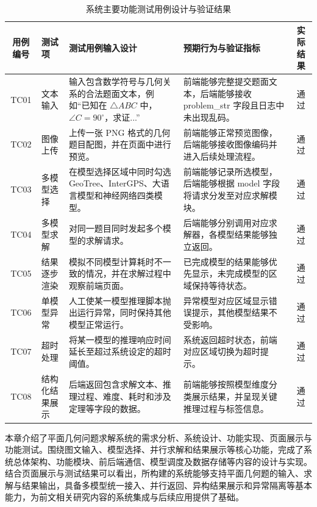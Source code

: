 \begin{table}[htbp]
    \small
    \centering
    \caption{系统主要功能测试用例设计与验证结果}
    \label{tab:function_test}
    \begin{tabularx}{\textwidth}{
        c
        >{\raggedright\arraybackslash}p{6em}
        >{\raggedright\arraybackslash}X
        >{\raggedright\arraybackslash}X
        c
        }
        \toprule
        用例编号 & 测试项 & 测试用例输入设计 & 预期行为与验证指标 & 实际结果 \\
        \midrule
        TC01 & 文本输入 & 输入包含数学符号与几何关系的合法题面文本，例如“已知在 $\triangle ABC$ 中，$\angle C=90^\circ$，求证...” & 前端能够完整提交题面文本，后端能够接收 problem\_str 字段且日志中未出现乱码。 & 通过 \\
        
        \addlinespace[0.3pt]
        TC02 & 图像上传 & 上传一张 PNG 格式的几何题目配图，并在页面中进行预览。 & 前端能够正常预览图像，后端能够接收图像编码并进入后续处理流程。 & 通过 \\
        
        \addlinespace[0.3pt]
        TC03 & 多模型选择 & 在模型选择区域中同时勾选 GeoTree、InterGPS、大语言模型和神经网络四类模型。 & 前端能够记录所选模型，后端能够根据 model 字段将请求分发至对应求解模块。 & 通过 \\
        
        \addlinespace[0.3pt]
        TC04 & 多模型求解 & 对同一题目同时发起多个模型的求解请求。 & 后端能够分别调用对应求解器，各模型结果能够独立返回。 & 通过 \\
        
        \addlinespace[0.3pt]
        TC05 & 结果逐步渲染 & 模拟不同模型计算耗时不一致的情况，并在求解过程中观察前端页面。 & 已完成模型的结果能够优先显示，未完成模型的区域保持等待状态。 & 通过 \\
        
        \addlinespace[0.3pt]
        TC06 & 单模型异常 & 人工使某一模型推理脚本抛出运行异常，同时保持其他模型正常运行。 & 异常模型对应区域显示错误提示，其他模型结果不受影响。 & 通过 \\
        
        \addlinespace[0.3pt]
        TC07 & 超时处理 & 将某一模型的推理响应时间延长至超过系统设定的超时阈值。 & 系统返回超时状态，前端对应区域切换为超时提示。 & 通过 \\
        
        \addlinespace[0.3pt]
        TC08 & 结构化结果展示 & 后端返回包含求解文本、推理过程、难度、耗时和涉及定理等字段的数据。 & 前端能够按照模型维度分类展示结果，并呈现关键推理过程与标签信息。 & 通过 \\
        \bottomrule
    \end{tabularx}
\end{table}

本章介绍了平面几何问题求解系统的需求分析、系统设计、功能实现、页面展示与功能测试。围绕图文输入、模型选择、并行求解和结果展示等核心功能，完成了系统总体架构、功能模块、前后端通信、模型调度及数据存储等内容的设计与实现。结合页面展示与测试结果可以看出，所构建的系统能够支持平面几何题的输入、求解与结果输出，具备多模型统一接入、并行返回、异构结果展示和异常隔离等基本能力，为前文相关研究内容的系统集成与后续应用提供了基础。